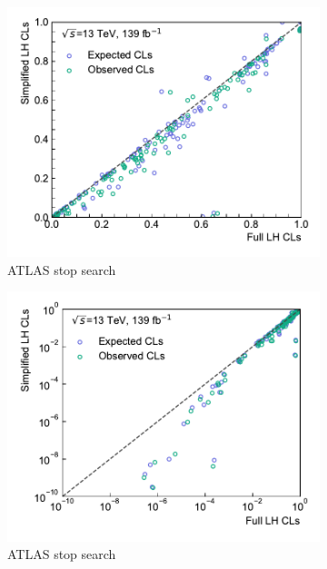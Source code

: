 \begin{figure}
\begin{subfigure}[b]{0.5\textwidth}
		\centering\includegraphics[width=\textwidth]{cls_scatter_stop1L_lin}
	\caption{ATLAS stop search}
	\end{subfigure}\hfill
	\begin{subfigure}[b]{0.5\textwidth}
		\centering\includegraphics[width=\textwidth]{cls_scatter_stop1L_log}
		\caption{ATLAS stop search}
	\end{subfigure}\hfill
	\begin{subfigure}[b]{0.5\textwidth}

\end{subfigure}
\end{figure}
